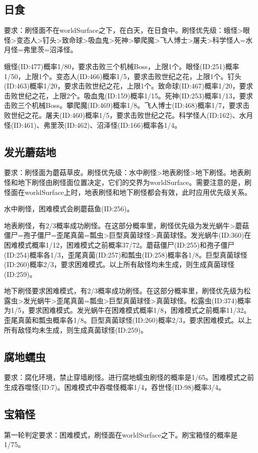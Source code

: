 \subsection{日食}
要求：刷怪面不在worldSurface之下，在白天，在日食中。刷怪优先级：蛾怪>眼怪>变态人>钉头>致命球>吸血鬼>死神>攀爬魔>飞人博士>屠夫>科学怪人=水月怪=弗里茨=沼泽怪。

蛾怪(ID:477)概率1/80，要求击败三个机械Boss，上限1个。眼怪(ID:251)概率1/50，上限1个。变态人(ID:466)概率1/5，要求击败世纪之花，上限1个。钉头(ID:463)概率1/20，要求击败世纪之花，上限1个。致命球(ID:467)概率1/20，要求击败世纪之花，上限2个。吸血鬼(ID:159)概率1/15。死神(ID:253)概率1/13，要求击败三个机械Boss。攀爬魔(ID:469)概率1/8。飞人博士(ID:468)概率1/7，要求击败世纪之花。屠夫(ID:460)概率1/5，要求击败世纪之花。科学怪人(ID:162)、水月怪(ID:461)、弗里茨(ID:462)、沼泽怪(ID:166)概率各1/4。

\subsection{发光蘑菇地}
要求：刷怪面为蘑菇草皮。刷怪优先级：水中刷怪>地表刷怪>地下刷怪。地表刷怪和地下刷怪由刷怪面位置决定，它们的交界为worldSurface。需要注意的是，刷怪面在worldSurface上时，地表刷怪和地下刷怪都会有效，此时应用优先级关系。

水中刷怪，困难模式会刷蘑菇鱼(ID:256)。

地表刷怪，有2/3概率成功刷怪。在这部分概率里，刷怪优先级为发光蜗牛>蘑菇僵尸=孢子僵尸=歪尾真菌=瓢虫>巨型真菌球怪>真菌球怪。发光蜗牛(ID:360)在困难模式概率1/12，困难模式之前概率37/72。蘑菇僵尸(ID:255)和孢子僵尸(ID:254)概率各1/3，歪尾真菌(ID:257)和瓢虫(ID:258)概率各1/8。巨型真菌球怪(ID:260)概率2/3，要求困难模式。以上所有敌怪均未生成，则生成真菌球怪(ID:259)。

地下刷怪要求困难模式，有2/3概率成功刷怪。在这部分概率里，刷怪优先级为松露虫>发光蜗牛>歪尾真菌=瓢虫>巨型真菌球怪>真菌球怪。松露虫(ID:374)概率为1/5，要求困难模式。发光蜗牛在困难模式概率1/8，困难模式之前概率11/32。歪尾真菌和瓢虫概率各1/8。巨型真菌球怪(ID:260)概率2/3，要求困难模式。以上所有敌怪均未生成，则生成真菌球怪(ID:259)。

\subsection{腐地蠕虫}
要求：腐化环境，禁止穿墙刷怪。进行腐地蠕虫刷怪的概率是1/65。困难模式之前生成吞噬怪(ID:7)。困难模式中吞噬怪概率1/4，吞世怪(ID:98)概率3/4。

\subsection{宝箱怪}
第一轮判定要求：困难模式，刷怪面在worldSurface之下。刷宝箱怪的概率是1/75。

